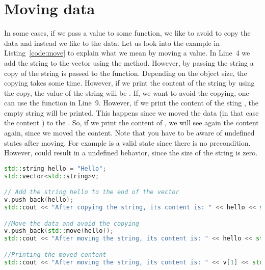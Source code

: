 \section{Moving data}
\label{sec:moving:data}
In some cases, if we pass a value to some function, we like to avoid to copy the data and instead we like to  the data. Let us look into the example in Listing~\ref{code:move} to explain what we mean by moving a value. In Line~4 we add the string  to the vector using the  method. However, by passing the string  a copy of the string is passed to the function. Depending on the object size, the copying takes some time. However, if we print the content of the string  by using the copy, the value of the string will be . If, we want to avoid the copying, one can use the  function in Line~9. However, if we print the content of the sting , the empty string will be printed. This happens since we moved the data (in that case the content ) to the . So, if we print the content of , we will see again the content  again, since we moved the content. Note that you have to be aware of undefined states after moving. For example  is a valid state since there is no precondition. However,  could result in a undefined behavior, since the size of the string is zero.


\begin{lstlisting}[language=c++,caption={Example for the usage of \cpp{std::move} to move data.
\label{code:move}},float,floatplacement=tb]
std::string hello = "Hello";
std::vector<std::string>v;

// Add the string hello to the end of the vector
v.push_back(hello);
std::cout << "After copying the string, its content is: " << hello << std::endl;

//Move the data and avoid the copying
v.push_back(std::move(hello));
std::cout << "After moving the string, its content is: " << hello << std::endl;

//Printing the moved content
std::cout << "After moving the string, its content is: " << v[1] << std::endl;

\end{lstlisting}

